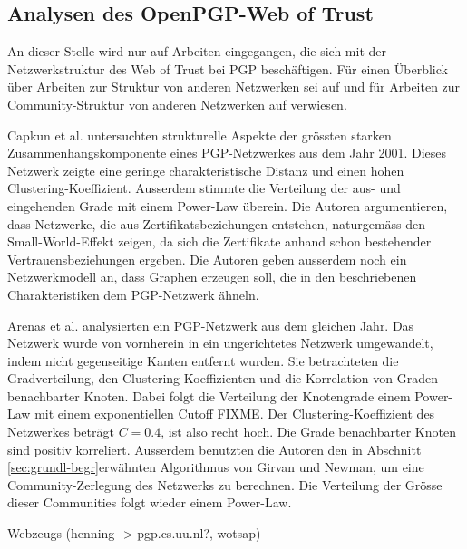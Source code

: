 \subsection{Analysen des OpenPGP-Web of Trust}
\label{ch:Grundlagen:sec:RelatedWork:subsec:wot-analysis}

An dieser Stelle wird nur auf Arbeiten eingegangen, die sich mit der
Netzwerkstruktur des Web of Trust bei PGP besch\"aftigen. F\"ur einen
\"Uberblick \"uber Arbeiten zur Struktur von anderen Netzwerken sei
auf \cite{newman:167}und f\"ur Arbeiten zur Community-Struktur von
anderen Netzwerken auf \cite{Fortunato2010} verwiesen.

Capkun et al. \cite{Capkun2002} untersuchten strukturelle Aspekte der
gr\"ossten starken Zusammenhangskomponente eines PGP-Netzwerkes aus
dem Jahr 2001. Dieses Netzwerk zeigte eine geringe charakteristische
Distanz und einen hohen Clustering-Koeffizient. Ausserdem stimmte die
Verteilung der aus- und eingehenden Grade mit einem Power-Law
\"uberein. Die Autoren argumentieren, dass Netzwerke, die aus
Zertifikatsbeziehungen entstehen, naturgem\"ass den Small-World-Effekt
zeigen, da sich die Zertifikate anhand schon bestehender
Vertrauensbeziehungen ergeben. Die Autoren geben ausserdem noch ein
Netzwerkmodell an, dass Graphen erzeugen soll, die in den
beschriebenen Charakteristiken dem PGP-Netzwerk \"ahneln.

Arenas et al. \cite{Boguna2004} analysierten ein PGP-Netzwerk aus dem
gleichen Jahr. Das Netzwerk wurde von vornherein in ein ungerichtetes
Netzwerk umgewandelt, indem nicht gegenseitige Kanten entfernt
wurden. Sie betrachteten die Gradverteilung, den
Clustering-Koeffizienten und die Korrelation von Graden benachbarter
Knoten. Dabei folgt die Verteilung der Knotengrade einem Power-Law mit
einem exponentiellen Cutoff FIXME. Der Clustering-Koeffizient des
Netzwerkes betr\"agt $C=0.4$, ist also recht hoch. Die Grade
benachbarter Knoten sind positiv korreliert. Ausserdem benutzten die
Autoren den in Abschnitt \ref{sec:grundl-begr}erw\"ahnten Algorithmus
von Girvan und Newman, um eine Community-Zerlegung des Netzwerks zu
berechnen. Die Verteilung der Gr\"osse dieser Communities folgt wieder
einem Power-Law.

Webzeugs (henning -> pgp.cs.uu.nl?, wotsap)

